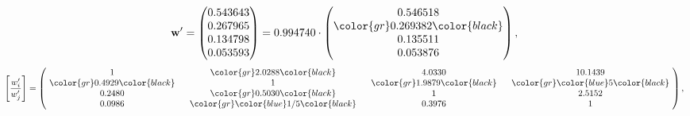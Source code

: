 \begin{example}
\begin{equation*}
\mathbf{w}^{\prime} =
\begin{pmatrix}
0.543643\\
0.267965\\
0.134798\\
0.053593
\end{pmatrix} =
0.994740\cdot
\begin{pmatrix}
0.546518\\
\color{gr} 0.269382\color{black} \\
0.135511\\
0.053876
\end{pmatrix},
\end{equation*}
\begin{equation*}
\left[ \frac{{w}^{\prime}_i}{{w}^{\prime}_j} \right] =
\begin{pmatrix}
$\,\,$ 1 $\,\,$ & $\,\,$\color{gr} 2.0288\color{black} $\,\,$ & $\,\,$4.0330$\,\,$ & $\,\,$10.1439$\,\,$ \\
$\,\,$\color{gr} 0.4929\color{black} $\,\,$ & $\,\,$ 1 $\,\,$ & $\,\,$\color{gr} 1.9879\color{black} $\,\,$ & $\,\,$\color{gr} \color{blue} 5\color{black}   $\,\,$ \\
$\,\,$0.2480$\,\,$ & $\,\,$\color{gr} 0.5030\color{black} $\,\,$ & $\,\,$ 1 $\,\,$ & $\,\,$2.5152 $\,\,$ \\
$\,\,$0.0986$\,\,$ & $\,\,$\color{gr} \color{blue}  1/5\color{black} $\,\,$ & $\,\,$0.3976$\,\,$ & $\,\,$ 1  $\,\,$ \\
\end{pmatrix},
\end{equation*}
\end{example}
\newpage

